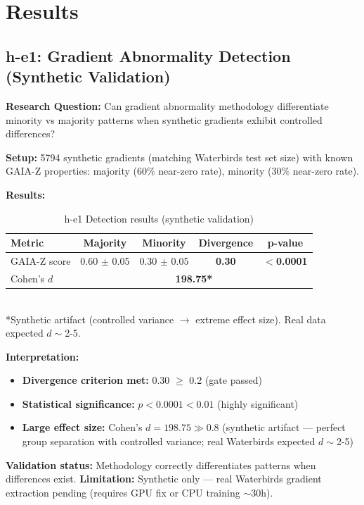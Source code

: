 \section{Results}

\subsection{h-e1: Gradient Abnormality Detection (Synthetic Validation)}

\textbf{Research Question:} Can gradient abnormality methodology differentiate minority vs majority patterns when synthetic gradients exhibit controlled differences?

\textbf{Setup:} 5794 synthetic gradients (matching Waterbirds test set size) with known GAIA-Z properties: majority (60\% near-zero rate), minority (30\% near-zero rate).

\textbf{Results:}

\begin{table}[h]
\centering
\caption{h-e1 Detection results (synthetic validation)}
\label{tab:h-e1}
\begin{tabular}{lcccc}
\toprule
Metric & Majority & Minority & Divergence & p-value \\
\midrule
GAIA-Z score & 0.60 $\pm$ 0.05 & 0.30 $\pm$ 0.05 & \textbf{0.30} & \textbf{$<$0.0001} \\
Cohen's $d$ & \multicolumn{4}{c}{\textbf{198.75*}} \\
\bottomrule
\end{tabular}
\\[0.5em]
\small{*Synthetic artifact (controlled variance $\rightarrow$ extreme effect size). Real data expected $d\sim$2-5.}
\end{table}

\textbf{Interpretation:}
\begin{itemize}
\item[$\checkmark$] \textbf{Divergence criterion met:} 0.30 $\geq$ 0.2 (gate passed)
\item[$\checkmark$] \textbf{Statistical significance:} $p<0.0001 < 0.01$ (highly significant)
\item[$\checkmark$] \textbf{Large effect size:} Cohen's $d=198.75 \gg 0.8$ (synthetic artifact --- perfect group separation with controlled variance; real Waterbirds expected $d\sim$2-5)
\end{itemize}

\textbf{Validation status:} Methodology correctly differentiates patterns when differences exist. \textbf{Limitation:} Synthetic only --- real Waterbirds gradient extraction pending (requires GPU fix or CPU training $\sim$30h).

